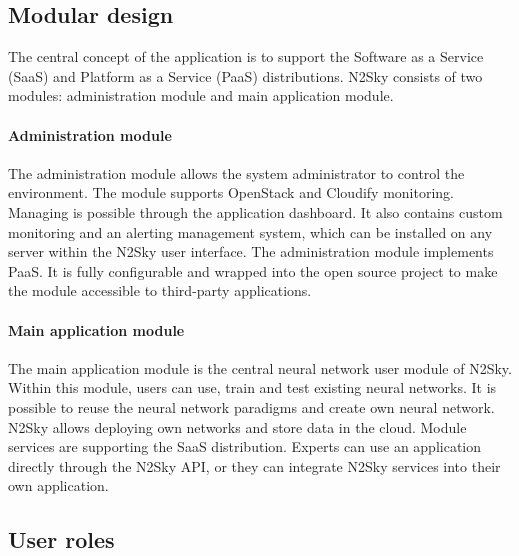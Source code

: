 \documentclass[conference]{IEEEtran}
\begin{document}
\subsection{Modular design}
The central concept of the application is to support the Software as a Service (SaaS) and Platform as a Service (PaaS) distributions.  N2Sky consists of two modules: administration module and main application module.

\paragraph{Administration module} The administration module allows the system administrator to control the environment. The module supports OpenStack and Cloudify monitoring. Managing is possible through the application dashboard. It also contains custom monitoring and an alerting management system, which can be installed on any server within the N2Sky user interface. The administration module implements PaaS. It is fully configurable and wrapped into the open source project to make the module accessible to third-party applications.
\paragraph{Main application module} The main application module is the central neural network user module of N2Sky. Within this module, users can use, train and test existing neural networks. It is possible to reuse the neural network paradigms and create own neural network. N2Sky allows deploying own networks and store data in the cloud. Module services are supporting the SaaS distribution. Experts can use an application directly through the N2Sky API, or they can integrate N2Sky services into their own application.

\subsection{User roles}
\end{document}
